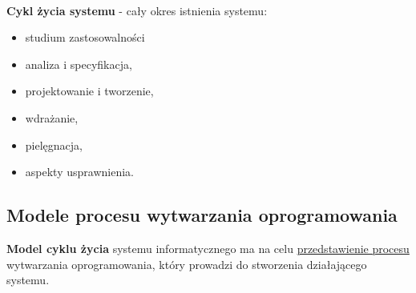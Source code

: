 \documentclass[a4paper]{article}
\begin{document}
    \hfill \\
    \textbf{Cykl życia systemu} - cały okres istnienia systemu:
    \begin{itemize}
        \item studium zastosowalności
        \item analiza i specyfikacja,
        \item projektowanie i tworzenie,
        \item wdrażanie,
        \item pielęgnacja,
        \item aspekty usprawnienia.
    \end{itemize}

    \subsection{Modele procesu wytwarzania oprogramowania}
    \textbf{Model cyklu życia} systemu informatycznego ma na celu \underline{przedstawienie procesu} wytwarzania
    oprogramowania, który prowadzi do stworzenia działającego systemu.
\end{document}
